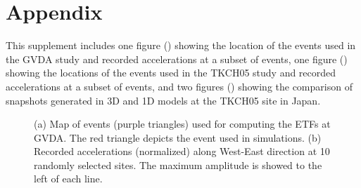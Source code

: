\section*{Appendix}

This supplement includes one figure () showing the location of the events used in the GVDA study and recorded accelerations at a subset of events, one figure () showing the locations of the events used in the TKCH05 study and recorded accelerations at a subset of events, and two figures () showing the comparison of snapshots generated in 3D and 1D models at the TKCH05 site in Japan.

\clearpage
{}
\begin{figure}[!ht]
   \hfil
  \caption{(a) Map of events (purple triangles) used for computing the ETFs at GVDA. The red triangle depicts the event used in simulations. (b) Recorded accelerations (normalized) along West-East direction at 10 randomly selected sites. The maximum amplitude is showed to the left of each line.}
  \label{fig:etf-S1}
\end{figure}


